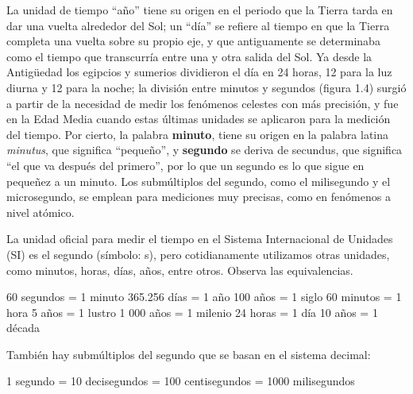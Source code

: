 \documentclass[11pt]{book}
\newenvironment{questions}[1][]{\enumerate[,#1]}{\endenumerate}
\begin{document}
La unidad de tiempo ``año'' tiene su origen en el periodo que la Tierra tarda
en dar una vuelta alrededor del Sol; un ``d\'ia''
se refiere al tiempo en que la Tierra completa una vuelta sobre su propio eje,
y que antiguamente se determinaba como el tiempo
que transcurr\'ia entre una y otra salida del Sol. Ya desde la Antigüedad los
egipcios y sumerios dividieron el d\'ia en 24 horas,
12 para la luz diurna y 12 para la noche; la divisi\'on entre minutos y segundos
(figura 1.4) surgi\'o a partir de la necesidad
de medir los fen\'omenos celestes con m\'as precisi\'on, y fue en la Edad Media
cuando estas \'ultimas unidades se aplicaron para la
medici\'on del tiempo. Por cierto, la palabra \textbf{minuto}, tiene su origen en
la palabra latina \emph{minutus}, que significa ``peque\~no'',
y \textbf{segundo} se deriva de secundus, que significa ``el que va despu\'es del
primero'', por lo que un segundo  es lo que
sigue en pequeñez a un minuto. Los subm\'ultiplos del segundo, como el
milisegundo y el microsegundo, se emplean para mediciones
muy precisas, como en fen\'omenos a nivel at\'omico.

La unidad oficial para medir el tiempo en el Sistema Internacional de Unidades
(SI) es el segundo (s\'imbolo: s), pero
cotidianamente utilizamos otras unidades, como minutos, horas, d\'ias, años,
entre otros. Observa las equivalencias.
\begin{multicols}{3}
  60 segundos = 1 minuto
  365.256 d\'ias = 1 año
  100 años = 1 siglo
  60 minutos = 1 hora
  5 años = 1 lustro
  1 000 años = 1 milenio
  24 horas = 1 d\'ia
  10 años = 1 d\'ecada
\end{multicols}
Tambi\'en hay subm\'ultiplos del segundo que se basan en el sistema decimal:

1 segundo = 10 decisegundos = 100 centisegundos = 1000 milisegundos



\end{document}

